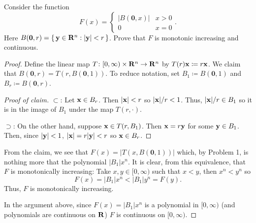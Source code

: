 \begin{problem}
Consider the function
\[
F(x)=
\begin{cases}
|B(\mathbf{0},x)|&x>0\\
0&x=0
\end{cases}.
\]
Here
$B(\mathbf{0},r)=\left\{\,\mathbf{y}\in\mathbf{R}^n:|\mathbf{y}|<r\,\right\}$. Prove
that $F$ is monotonic increasing and continuous.
\end{problem}
\begin{proof}
Define the linear map $T\colon[0,\infty)\times\mathbf{R}^n\to\mathbf{R}^n$ by
$T(r)\mathbf{x}\coloneqq r\mathbf{x}$. We claim that
$B(\mathbf{0},r)=T(r,B(\mathbf{0},1))$. To reduce notation, set
$B_1\coloneqq B(\mathbf{0},1)$ and $B_r\coloneqq B(\mathbf{0},r)$.
\begin{proof}[Proof of claim]
\renewcommand{\qedsymbol}{$\clubsuit$}
$\subset$: Let $\mathbf{x}\in B_r$. Then $|\mathbf{x}|<r$ so $|\mathbf{x}|/r<1$. Thus,
$|\mathbf{x}|/r\in B_1$ so it is in the image of $B_1$ under the map
$T(r,\cdot)$.

$\supset$: On the other hand, suppose $\mathbf{x}\in T(r,B_1)$. Then
$\mathbf{x}=r\mathbf{y}$ for some $\mathbf{y}\in B_1$. Then, since $|\mathbf{y}|<1$,
$|\mathbf{x}|=r|\mathbf{y}|<r$ so $\mathbf{x}\in B_r$.
\end{proof}

From the claim, we see that $F(x)=|T(x,B(\mathbf{0},1))|$ which, by Problem
1, is nothing more that the polynomial $|B_1|x^n$. It is clear,
from this equivalence, that $F$ is monotonically increasing: Take
$x,y\in[0,\infty)$ such that $x<y$, then $x^n<y^n$ so
\begin{equation}
\label{eq:prep:1:7}
F(x)=|B_1|x^n<|B_1|y^n=F(y).
\end{equation}
Thus, $F$ is monotonically increasing.

In the argument above, since $F(x)=|B_1|x^n$ is a polynomial in
$[0,\infty)$ (and polynomials are continuous on $\mathbf{R}$) $F$ is continuous
on $[0,\infty)$.
\end{proof}

